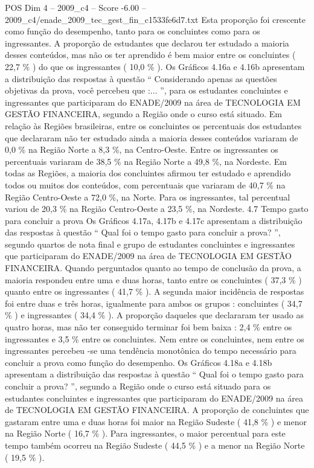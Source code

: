 \begin{textsample}{POS Dim 4 – 2009\_c4 – Score -6.00 – 2009\_c4/enade\_2009\_tec\_gest\_fin\_c1533fe6d7.txt}
Esta proporção foi crescente como função do desempenho, tanto para os concluintes como para os ingressantes.
A proporção de estudantes que declarou ter estudado a maioria desses conteúdos, mas não os ter aprendido é bem maior entre os concluintes ( 22,7 \% ) do que os ingressantes ( 10,0 \% ).
Os Gráficos 4.16a e 4.16b apresentam a distribuição das respostas à questão “ Considerando apenas as questões objetivas da prova, você percebeu que :... ”, para os estudantes concluintes e ingressantes que participaram do ENADE/2009 na área de TECNOLOGIA EM GESTÃO FINANCEIRA, segundo a Região onde o curso está situado.
Em relação às Regiões brasileiras, entre os concluintes os percentuais dos estudantes que declararam não ter estudado ainda a maioria desses conteúdos variaram de 0,0 \% na Região Norte a 8,3 \%, na Centro-Oeste.
Entre os ingressantes os percentuais variaram de 38,5 \% na Região Norte a 49,8 \%, na Nordeste.
Em todas as Regiões, a maioria dos concluintes afirmou ter estudado e aprendido todos ou muitos dos conteúdos, com percentuais que variaram de 40,7 \% na Região Centro-Oeste a 72,0 \%, na Norte.
Para os ingressantes, tal percentual variou de 20,3 \% na Região Centro-Oeste a 23,5 \%, na Nordeste. 4.7 Tempo gasto para concluir a prova Os Gráficos 4.17a, 4.17b e 4.17c apresentam a distribuição das respostas à questão “ Qual foi o tempo gasto para concluir a prova? ”, segundo quartos de nota final e grupo de estudantes concluintes e ingressantes que participaram do ENADE/2009 na área de TECNOLOGIA EM GESTÃO FINANCEIRA.
Quando perguntados quanto ao tempo de conclusão da prova, a maioria respondeu entre uma e duas horas, tanto entre os concluintes ( 37,3 \% ) quanto entre os ingressantes ( 41,7 \% ).
A segunda maior incidência de respostas foi entre duas e três horas, igualmente para ambos os grupos : concluintes ( 34,7 \% ) e ingressantes ( 34,4 \% ).
A proporção daqueles que declararam ter usado as quatro horas, mas não ter conseguido terminar foi bem baixa : 2,4 \% entre os ingressantes e 3,5 \% entre os concluintes.
Nem entre os concluintes, nem entre os ingressantes percebeu -se uma tendência monotônica do tempo necessário para concluir a prova como função do desempenho.
Os Gráficos 4.18a e 4.18b apresentam a distribuição das respostas à questão “ Qual foi o tempo gasto para concluir a prova? ”, segundo a Região onde o curso está situado para os estudantes concluintes e ingressantes que participaram do ENADE/2009 na área de TECNOLOGIA EM GESTÃO FINANCEIRA.
A proporção de concluintes que gastaram entre uma e duas horas foi maior na Região Sudeste ( 41,8 \% ) e menor na Região Norte ( 16,7 \% ).
Para ingressantes, o maior percentual para este tempo também ocorreu na Região Sudeste ( 44,5 \% ) e a menor na Região Norte ( 19,5 \% ).

\end{textsample}
